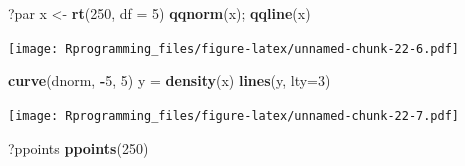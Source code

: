 \documentclass[11pt,]{krantz}
\makeatletter
\newenvironment{Shaded}{\begin{snugshade}}{\end{snugshade}}
\newcommand{\KeywordTok}[1]{\textcolor[rgb]{0.13,0.29,0.53}{\textbf{#1}}}
\newcommand{\DataTypeTok}[1]{\textcolor[rgb]{0.13,0.29,0.53}{#1}}
\newcommand{\DecValTok}[1]{\textcolor[rgb]{0.00,0.00,0.81}{#1}}
\newcommand{\StringTok}[1]{\textcolor[rgb]{0.31,0.60,0.02}{#1}}
\newcommand{\OperatorTok}[1]{\textcolor[rgb]{0.81,0.36,0.00}{\textbf{#1}}}
\newcommand{\NormalTok}[1]{#1}
\newenvironment{kframe}{%
\medskip{}
\setlength{\fboxsep}{.8em}
 \def\at@end@of@kframe{}%
 \ifinner\ifhmode%
  \def\at@end@of@kframe{\end{minipage}}%
  \begin{minipage}{\columnwidth}%
 \fi\fi%
 \def\FrameCommand##1{\hskip\@totalleftmargin \hskip-\fboxsep
 \colorbox{shadecolor}{##1}\hskip-\fboxsep
     \hskip-\linewidth \hskip-\@totalleftmargin \hskip\columnwidth}%
 \MakeFramed {\advance\hsize-\width
   \@totalleftmargin\z@ \linewidth\hsize
   \@setminipage}}%
 {\par\unskip\endMakeFramed%
 \at@end@of@kframe}
\renewenvironment{Shaded}{\begin{kframe}}{\end{kframe}}
\theoremstyle{definition}
\theoremstyle{definition}
\theoremstyle{remark}
\makeatother
\begin{document}
\begin{Shaded}
\begin{Highlighting}[]
\NormalTok{?par}
\NormalTok{x <-}\StringTok{ }\KeywordTok{rt}\NormalTok{(}\DecValTok{250}\NormalTok{, }\DataTypeTok{df =} \DecValTok{5}\NormalTok{)}
\KeywordTok{qqnorm}\NormalTok{(x); }\KeywordTok{qqline}\NormalTok{(x)}
\end{Highlighting}
\end{Shaded}

\texttt{[image: Rprogramming\_files/figure-latex/unnamed-chunk-22-6.pdf]}

\begin{Shaded}
\begin{Highlighting}[]
\KeywordTok{curve}\NormalTok{(dnorm, }\OperatorTok{-}\DecValTok{5}\NormalTok{, }\DecValTok{5}\NormalTok{)}
\NormalTok{y =}\StringTok{ }\KeywordTok{density}\NormalTok{(x)}
\KeywordTok{lines}\NormalTok{(y, }\DataTypeTok{lty=}\DecValTok{3}\NormalTok{)}
\end{Highlighting}
\end{Shaded}

\texttt{[image: Rprogramming\_files/figure-latex/unnamed-chunk-22-7.pdf]}

\begin{Shaded}
\begin{Highlighting}[]
\NormalTok{?ppoints}
\KeywordTok{ppoints}\NormalTok{(}\DecValTok{250}\NormalTok{)}
\end{Highlighting}
\end{Shaded}
\end{document}
